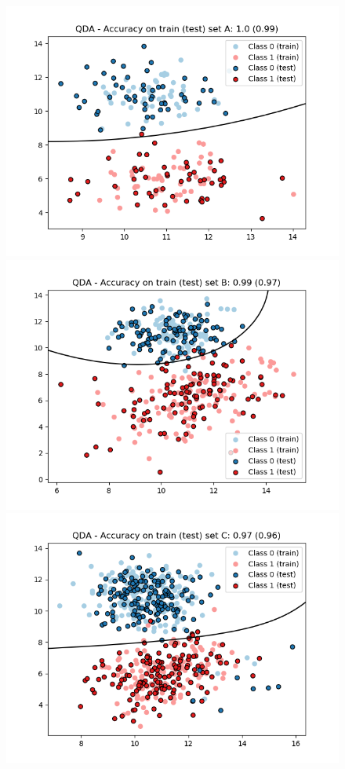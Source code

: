\documentclass[a4paper, 11pt]{article}
\begin{document}
\begin{enumerate}[label=\alph*]
        \begin{figure}[!htb]
          \includegraphics[width=\linewidth]{./images/QDA_A.png}
          \label{fig:qda_a}
        \endminipage\hfill
          \includegraphics[width=\linewidth]{./images/QDA_B.png}
          \label{fig:qda_b}
        \endminipage\hfill
          \includegraphics[width=\linewidth]{./images/QDA_C.png}

\end{figure}
\end{enumerate}
\end{document}
